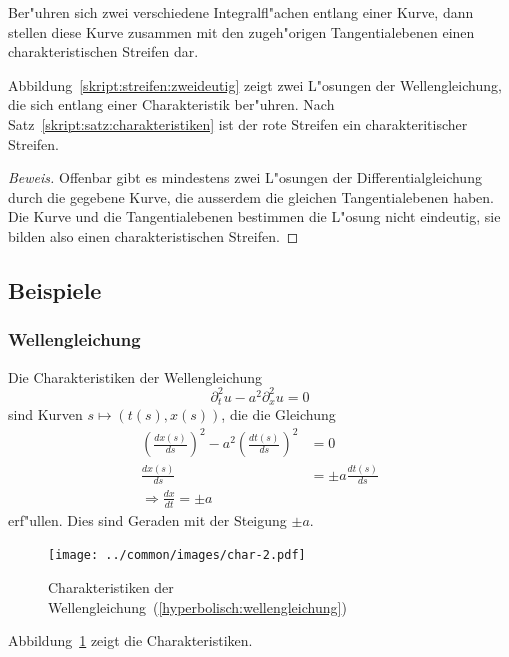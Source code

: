 \begin{satz}
\label{skript:satz:charakteristiken}
Ber"uhren sich zwei verschiedene Integralfl"achen entlang einer
Kurve, dann stellen diese Kurve zusammen mit den zugeh"origen Tangentialebenen
einen charakteristischen Streifen dar.
\end{satz}

Abbildung~\ref{skript:streifen:zweideutig} zeigt zwei L"osungen der
Wellengleichung, die sich entlang einer Charakteristik ber"uhren.
Nach Satz~\ref{skript:satz:charakteristiken} ist der rote Streifen ein
charakteritischer Streifen.

\begin{proof}[Beweis]
Offenbar gibt es mindestens zwei L"osungen der Differentialgleichung
durch die gegebene Kurve, die ausserdem die gleichen Tangentialebenen
haben. Die Kurve und die Tangentialebenen bestimmen die L"osung nicht
eindeutig, sie bilden also einen charakteristischen Streifen.
\end{proof}

\subsection{Beispiele}
\subsubsection{Wellengleichung}
Die Charakteristiken der Wellengleichung
\begin{equation}
\partial_t^2u-a^2\partial_x^2u=0
\label{hyperbolisch:wellengleichung}
\end{equation}
sind Kurven $s\mapsto(t(s),x(s))$, die die Gleichung
\begin{align*}
\left(
\frac{dx(s)}{ds}\right)^2-a^2\left(\frac{dt(s)}{ds}\right)^2&=0
\\
\frac{dx(s)}{ds}
&=
\pm a\frac{dt(s)}{ds}
\\
\Rightarrow
\frac{dx}{dt}=\pm a
\end{align*}
erf"ullen. Dies sind Geraden mit der Steigung $\pm a$.
\begin{figure}
\begin{center}
\texttt{[image: ../common/images/char-2.pdf]}
\end{center}
\caption{Charakteristiken der
Wellengleichung~(\ref{hyperbolisch:wellengleichung})
\label{hyp:wellen}}
\end{figure}
Abbildung~\ref{hyp:wellen} zeigt die Charakteristiken.

